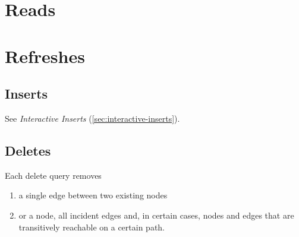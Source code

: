 \section{Reads}
\label{sec:bi-reads}




\section{Refreshes}
\label{sec:bi-refreshes}

\subsection{Inserts}
\label{sec:bi-inserts}

See \emph{Interactive Inserts} (\autoref{sec:interactive-inserts}).

\subsection{Deletes}
\label{sec:bi-deletes}

Each delete query removes

\begin{enumerate}
    \item a single edge between two existing nodes
    \item or a node, all incident edges and, in certain cases, nodes and edges that are transitively reachable on a certain path.
\end{enumerate}


